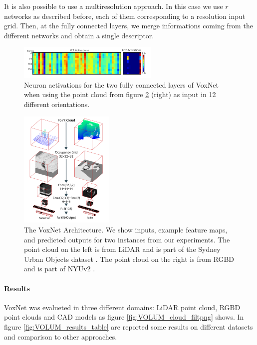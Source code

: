 It is also possible to use a multiresolution approach. In this case we use $r$ networks as described before, each of them corresponding to a resolution input grid. Then, at the fully connected layers, we merge informations coming from the different networks and obtain a single descriptor.

\begin{figure}[ht]
    \centering
    \captionsetup{width=.7\linewidth}
    \includegraphics[width=0.6\textwidth]{images/VOLUM_invariance.png}
    \caption{Neuron activations for the two fully connected layers of VoxNet
when using the point cloud from figure \ref{fig:VoxNet_archtecture} (right) as input in 12 different
orientations.}
    \label{fig:VOLUM_invariance}
\end{figure}

\begin{figure}[ht]
    \centering
    \captionsetup{width=.9\linewidth}
    \includegraphics[width=0.4\textwidth]{images/VoxNet_archtecture.png}
    \caption{The VoxNet Architecture. We show inputs, example
feature maps, and predicted outputs for two instances from our experiments.
The point cloud on the left is from LiDAR and is part of the Sydney Urban
Objects dataset \cite{dataset_ICRA2012}. The point cloud on the right is from RGBD and is part of NYUv2 \cite{dataset_ECCV2012}.}
    \label{fig:VoxNet_archtecture}
\end{figure}

\paragraph{Results}
VoxNet was evalueted in three different domains: LiDAR point cloud, RGBD point clouds and CAD models as figure \ref{fig:VOLUM_cloud_filtpng} shows. In figure \ref{fig:VOLUM_results_table} are reported some results on different datasets and comparison to other approaches. 


